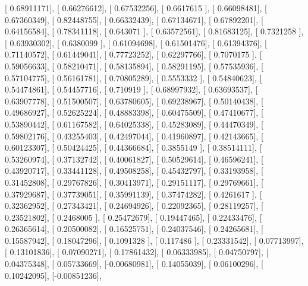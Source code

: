 \documentclass{article}
\begin{document}
       [ 0.68911171],
       [ 0.66276612],
       [ 0.67532256],
       [ 0.6617615 ],
       [ 0.66098481],
       [ 0.67360349],
       [ 0.82448755],
       [ 0.66332439],
       [ 0.67134671],
       [ 0.67892201],
       [ 0.64156584],
       [ 0.78341118],
       [ 0.643071  ],
       [ 0.63572561],
       [ 0.81683125],
       [ 0.7321258 ],
       [ 0.63930302],
       [ 0.6380099 ],
       [ 0.61094698],
       [ 0.61501476],
       [ 0.61394376],
       [ 0.71140572],
       [ 0.61449041],
       [ 0.77723252],
       [ 0.62297766],
       [ 0.7070175 ],
       [ 0.59056633],
       [ 0.58210471],
       [ 0.58135894],
       [ 0.58291195],
       [ 0.57535936],
       [ 0.57104775],
       [ 0.56161781],
       [ 0.70805289],
       [ 0.5553332 ],
       [ 0.54840623],
       [ 0.54474861],
       [ 0.54457716],
       [ 0.710919  ],
       [ 0.68997932],
       [ 0.63693537],
       [ 0.63907778],
       [ 0.51500507],
       [ 0.63780605],
       [ 0.69238967],
       [ 0.50140438],
       [ 0.49686927],
       [ 0.52625224],
       [ 0.48883398],
       [ 0.60475509],
       [ 0.47410677],
       [ 0.53890442],
       [ 0.61167582],
       [ 0.64025338],
       [ 0.45283089],
       [ 0.44470349],
       [ 0.59802176],
       [ 0.43255403],
       [ 0.42497044],
       [ 0.41960897],
       [ 0.42143665],
       [ 0.60123307],
       [ 0.50424425],
       [ 0.44366684],
       [ 0.3855149 ],
       [ 0.38514111],
       [ 0.53260974],
       [ 0.37132742],
       [ 0.40061827],
       [ 0.50529614],
       [ 0.46596241],
       [ 0.43920717],
       [ 0.33441128],
       [ 0.49508258],
       [ 0.45432797],
       [ 0.33193958],
       [ 0.31452808],
       [ 0.29767826],
       [ 0.30413971],
       [ 0.29151117],
       [ 0.29769661],
       [ 0.37929687],
       [ 0.37739051],
       [ 0.35991139],
       [ 0.37474282],
       [ 0.4261617 ],
       [ 0.32362952],
       [ 0.27343421],
       [ 0.24694926],
       [ 0.22092365],
       [ 0.28119257],
       [ 0.23521802],
       [ 0.2468005 ],
       [ 0.25472679],
       [ 0.19447465],
       [ 0.22433476],
       [ 0.26365614],
       [ 0.20500082],
       [ 0.16525751],
       [ 0.24037546],
       [ 0.24265681],
       [ 0.15587942],
       [ 0.18047296],
       [ 0.1091328 ],
       [ 0.117486  ],
       [ 0.23331542],
       [ 0.07713997],
       [ 0.13101836],
       [ 0.07090271],
       [ 0.17861432],
       [ 0.06333985],
       [ 0.04750797],
       [ 0.04375348],
       [ 0.05733669],
       [-0.00680981],
       [ 0.14055039],
       [ 0.06100296],
       [ 0.10242095],
       [-0.00851236],
\end{document}
